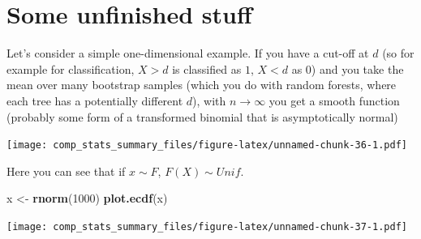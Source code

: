\documentclass[]{book}
\newenvironment{Shaded}{\begin{snugshade}}{\end{snugshade}}
\newcommand{\KeywordTok}[1]{\textcolor[rgb]{0.13,0.29,0.53}{\textbf{{#1}}}}
\newcommand{\DataTypeTok}[1]{\textcolor[rgb]{0.13,0.29,0.53}{{#1}}}
\newcommand{\DecValTok}[1]{\textcolor[rgb]{0.00,0.00,0.81}{{#1}}}
\newcommand{\StringTok}[1]{\textcolor[rgb]{0.31,0.60,0.02}{{#1}}}
\newcommand{\NormalTok}[1]{{#1}}
\begin{document}
\section{Some unfinished stuff}\label{some-unfinished-stuff}

Let's consider a simple one-dimensional example. If you have a cut-off
at \(d\) (so for example for classification, \(X > d\) is classified as
\(1\), \(X < d\) as \(0\)) and you take the mean over many bootstrap
samples (which you do with random forests, where each tree has a
potentially different \(d\)), with \(n \rightarrow \infty\) you get a
smooth function (probably some form of a transformed binomial that is
asymptotically normal)

\begin{Shaded}
\end{Shaded}

\texttt{[image: comp\_stats\_summary\_files/figure-latex/unnamed-chunk-36-1.pdf]}

Here you can see that if \(x \sim F\), \(F(X) \sim Unif\).

\begin{Shaded}
\begin{Highlighting}[]
\NormalTok{x <-}\StringTok{ }\KeywordTok{rnorm}\NormalTok{(}\DecValTok{1000}\NormalTok{)}
\KeywordTok{plot.ecdf}\NormalTok{(x)}
\end{Highlighting}
\end{Shaded}

\texttt{[image: comp\_stats\_summary\_files/figure-latex/unnamed-chunk-37-1.pdf]}
\end{document}
